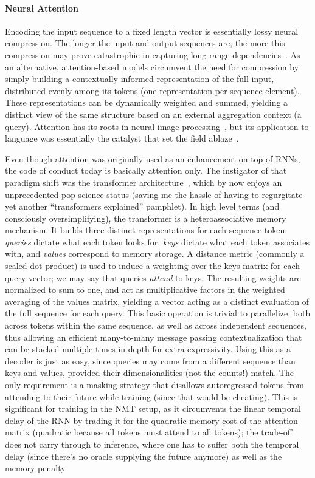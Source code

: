 \paragraph{Neural Attention}
Encoding the input sequence to a fixed length vector is essentially lossy neural compression.
The longer the input and output sequences are, the more this compression may prove catastrophic in capturing long range dependencies~\cite{cho2014properties}.
As an alternative, attention-based models circumvent the need for compression by simply building a contextually informed representation of the full input, distributed evenly among its tokens (one representation per sequence element).
These representations can be dynamically weighted and summed, yielding a distinct view of the same structure based on an external aggregation context (a query).
Attention has its roots in neural image processing~\cite[inter alia]{larochelle2010learning,NIPS2014_09c6c378}, but its application to language was essentially the catalyst that set the field ablaze~\cite{bahdanau2015neural}.

Even though attention was originally used as an enhancement on top of RNNs, the code of conduct today is basically attention only.
The instigator of that paradigm shift was the transformer architecture~\cite{vaswani2017attention}, which by now enjoys an unprecedented pop-science status (saving me the hassle of having to regurgitate yet another ``transformers explained'' pamphlet).
In high level terms (and consciously oversimplifying), the transformer is a heteroassociative memory mechanism.
It builds three distinct representations for each sequence token: \textit{queries} dictate what each token looks for, \textit{keys} dictate what each token associates with, and \textit{values} correspond to memory storage.
A distance metric (commonly a scaled dot-product) is used to induce a weighting over the keys matrix for each query vector; we may say that queries \textit{attend} to keys.
The resulting weights are normalized to sum to one, and act as multiplicative factors in the weighted averaging of the values matrix, yielding a vector acting as a distinct evaluation of the full sequence for each query.
This basic operation is trivial to parallelize, both across tokens within the same sequence, as well as across independent sequences, thus allowing an efficient many-to-many message passing contextualization that can be stacked multiple times in depth for extra expressivity.
Using this as a decoder is just as easy, since queries may come from a different sequence than keys and values, provided their dimensionalities (not the counts!) match.
The only requirement is a masking strategy that disallows autoregressed tokens from attending to their future while training (since that would be cheating).
This is significant for training in the NMT setup, as it circumvents the linear temporal delay of the RNN by trading it for the quadratic memory cost of the attention matrix (quadratic because all tokens must attend to all tokens); the trade-off does not carry through to inference, where one has to suffer both the temporal delay (since there's no oracle supplying the future anymore) as well as the memory penalty.

